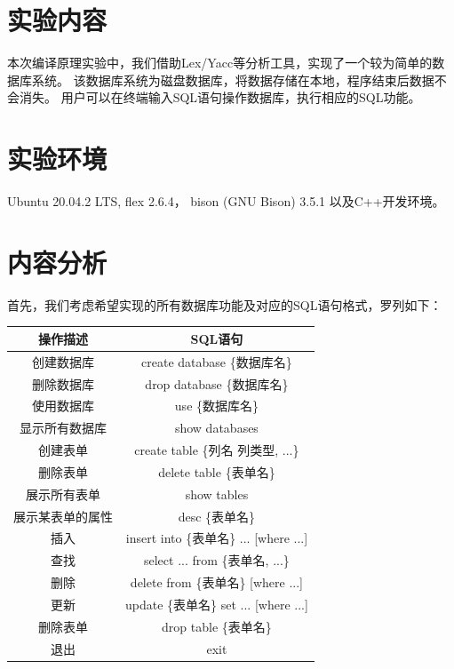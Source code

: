 \documentclass{article}
\begin{document}
\begin{spacing}{2}
\pagestyle{plain}
\setcounter{page}{1}
\section{实验内容}
    本次编译原理实验中，我们借助Lex/Yacc等分析工具，实现了一个较为简单的数据库系统。
    该数据库系统为磁盘数据库，将数据存储在本地，程序结束后数据不会消失。
    用户可以在终端输入SQL语句操作数据库，执行相应的SQL功能。
\section{实验环境}
    Ubuntu 20.04.2 LTS, flex 2.6.4， bison (GNU Bison) 3.5.1 以及C++开发环境。
\section{内容分析}
    首先，我们考虑希望实现的所有数据库功能及对应的SQL语句格式，罗列如下：

    \begin{table}[h]
    \centering
        \begin{tabular}{|c|c|}
        \hline \textbf{操作描述} & \textbf{SQL语句} \\
        \hline 创建数据库 & create database  \{数据库名\} \\
        \hline 删除数据库 & drop database  \{数据库名\}\\
        \hline 使用数据库 & use  \{数据库名\} \\
        \hline 显示所有数据库 & show databases \\
        \hline 创建表单 & create table \{列名 \space 列类型, ...\} \\
        \hline 删除表单 & delete table  \{表单名\} \\
        \hline 展示所有表单 & show tables \\
        \hline 展示某表单的属性 & desc  \{表单名\} \\
        \hline 插入 & insert into  \{表单名\} ... [where ...] \\
        \hline 查找 & select ... from  \{表单名, ...\} \\
        \hline 删除 & delete from  \{表单名\} [where ...] \\
        \hline 更新 & update  \{表单名\} set ... [where ...] \\
        \hline 删除表单 & drop table  \{表单名\} \\ 
        \hline 退出 & exit \\
        \hline 
        \end{tabular}
    \end{table}


\end{spacing}
\end{document}
